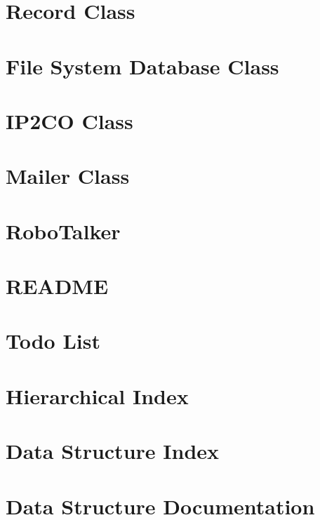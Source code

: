 \documentclass{book}
\begin{document}
\chapter{Record Class}
\label{record1}
\hypertarget{record1}{}

\chapter{File System Database Class}
\label{fsdb}
\hypertarget{fsdb}{}

\chapter{I\-P2\-C\-O Class}
\label{ip2country}
\hypertarget{ip2country}{}

\chapter{Mailer Class}
\label{mailer1}
\hypertarget{mailer1}{}

\chapter{Robo\-Talker}
\label{robo1}
\hypertarget{robo1}{}

\chapter{R\-E\-A\-D\-M\-E}
\label{md_README}
\hypertarget{md_README}{}

\chapter{Todo List}
\label{todo}
\hypertarget{todo}{}

\chapter{Hierarchical Index}

\chapter{Data Structure Index}

\chapter{Data Structure Documentation}




























\printindex
\end{document}
